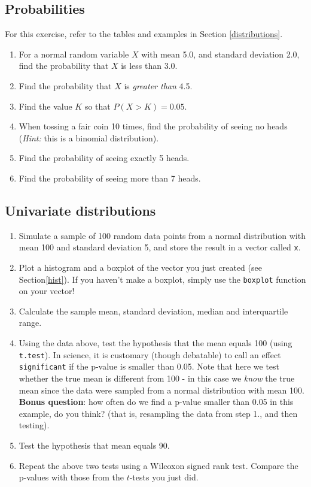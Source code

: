 \documentclass[]{book}
\begin{document}
\hypertarget{probabilities}{%
\subsection{Probabilities}\label{probabilities}}

For this exercise, refer to the tables and examples in Section \ref{distributions}.

\begin{enumerate}
\def\labelenumi{\arabic{enumi}.}
\item
  For a normal random variable \(X\) with mean 5.0, and standard deviation 2.0, find the probability that \(X\) is less than 3.0.
\item
  Find the probability that \(X\) is \emph{greater than} 4.5.
\item
  Find the value \(K\) so that \(P(X > K) = 0.05\).
\item
  When tossing a fair coin 10 times, find the probability of seeing no heads (\emph{Hint:} this is a binomial distribution).
\item
  Find the probability of seeing exactly 5 heads.
\item
  Find the probability of seeing more than 7 heads.
\end{enumerate}

\hypertarget{univariate-distributions}{%
\subsection{Univariate distributions}\label{univariate-distributions}}

\begin{enumerate}
\def\labelenumi{\arabic{enumi}.}
\item
  Simulate a sample of 100 random data points from a normal distribution with mean 100 and standard deviation 5, and store the result in a vector called \texttt{x}.
\item
  Plot a histogram and a boxplot of the vector you just created (see Section\ref{hist}). If you haven't make a boxplot, simply use the \texttt{boxplot} function on your vector!
\item
  Calculate the sample mean, standard deviation, median and interquartile range.
\item
  Using the data above, test the hypothesis that the mean equals 100 (using \texttt{t.test}). In science, it is customary (though debatable) to call an effect \texttt{significant} if the p-value is smaller than 0.05. Note that here we test whether the true mean is different from 100 - in this case we \emph{know} the true mean since the data were sampled from a normal distribution with mean 100. \textbf{Bonus question}: how often do we find a p-value smaller than 0.05 in this example, do you think? (that is, resampling the data from step 1., and then testing).
\item
  Test the hypothesis that mean equals 90.
\item
  Repeat the above two tests using a Wilcoxon signed rank test. Compare the p-values with those from the \(t\)-tests you just did.
\end{enumerate}
\end{document}

